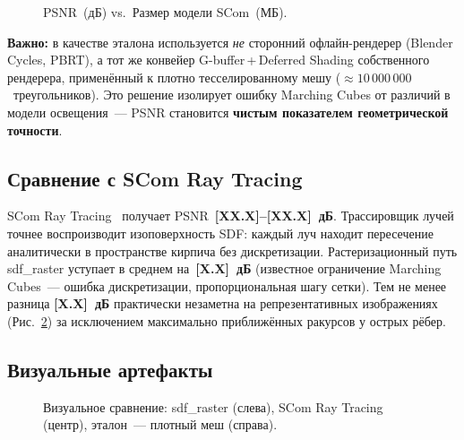 \begin{figure}[h]
  \centering
  \caption{PSNR~(дБ) vs.\ Размер модели SCom~(МБ).}
  \label{fig:psnr_vs_size}
\end{figure}

\textbf{Важно:} в качестве эталона используется \emph{не} сторонний
офлайн-рендерер (Blender Cycles, PBRT), а тот же конвейер G-buffer\,+\,Deferred
Shading собственного рендерера, применённый к плотно тесселированному мешу
(${\approx}10\,000\,000$~треугольников). Это решение изолирует ошибку
Marching Cubes от различий в модели освещения~--- PSNR становится
\textbf{чистым показателем геометрической точности}.

\subsection{Сравнение с SCom Ray Tracing}

SCom Ray Tracing~\cite{scom2025} получает PSNR~\textbf{[XX.X]--[XX.X]~дБ}.
Трассировщик лучей точнее воспроизводит изоповерхность SDF: каждый луч
находит пересечение аналитически в пространстве кирпича без дискретизации.
Растеризационный путь sdf\_raster уступает в среднем на~\textbf{[X.X]~дБ}
(известное ограничение Marching Cubes~--- ошибка дискретизации, пропорциональная
шагу сетки). Тем не менее разница \textbf{[X.X]~дБ} практически незаметна
на репрезентативных изображениях (Рис.~\ref{fig:visual_comparison})
за исключением максимально приближённых ракурсов у острых рёбер.

\subsection{Визуальные артефакты}

\begin{figure}[h]
  \centering
  \caption{Визуальное сравнение: sdf\_raster (слева), SCom Ray Tracing
    (центр), эталон~--- плотный меш (справа).}
  \label{fig:visual_comparison}
\end{figure}

